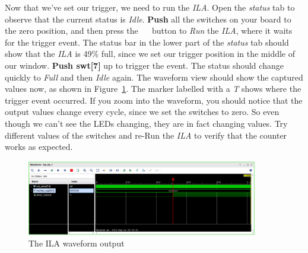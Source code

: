 \documentclass[11pt]{article}
\begin{document}
Now that we've set our trigger, we need to run the \textit{ILA}. Open the \textit{status} tab to observe that the current status is \textit{Idle}. \textbf{Push} all the switches on your board to the zero position, and then press the
~~
button to \textit{Run} the \textit{ILA}, where it waits for the trigger event.
The status bar in the lower part of the \textit{status} tab should show that the \textit{ILA} is 49\% full, since we set our trigger position in the middle of our window. \textbf{Push swt[7]} up to trigger the event. The status should change quickly to \textit{Full} and then \textit{Idle} again. The waveform view should show the captured values now, as shown in Figure~\ref{fig:ila_waveform}. The marker labelled with a \textit{T} shows where the trigger event occurred. If you zoom into the waveform, you should notice that the output values change every cycle, since we set the switches to zero. So even though we can't see the LEDs changing, they are in fact changing values. Try different values of the switches and re-Run the \textit{ILA} to verify that the counter works as expected.

\begin{figure}[!h]
    \centering
    \includegraphics[width=0.9\textwidth]{images/ila_waveform.png}
    \caption{The ILA waveform output}
    \label{fig:ila_waveform}
\end{figure}
\end{document}
